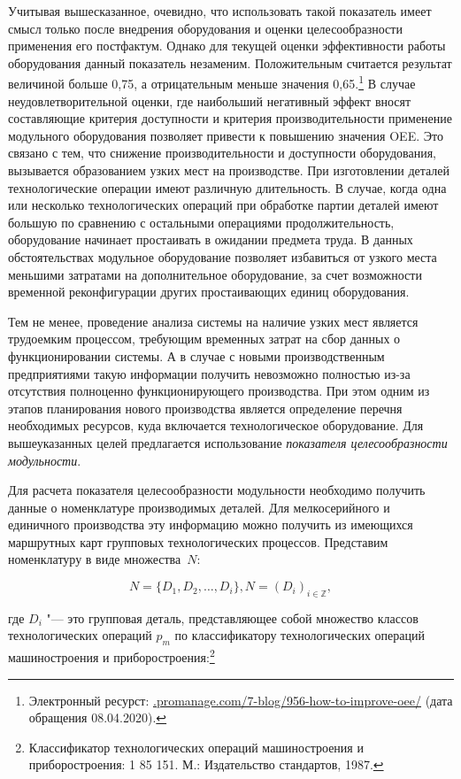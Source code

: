 Учитывая вышесказанное, очевидно, что использовать такой показатель имеет смысл только после внедрения оборудования и оценки целесообразности применения его постфактум. Однако для текущей оценки эффективности работы оборудования данный показатель незаменим. Положительным считается результат величиной больше 0,75, а отрицательным меньше значения 0,65.\footnote{Электронный ресурст: \url{.promanage.com/7-blog/956-how-to-improve-oee/} (дата обращения 08.04.2020).} В случае неудовлетворительной оценки, где наибольший негативный эффект вносят составляющие критерия доступности и критерия производительности применение модульного оборудования позволяет привести к повышению значения OEE. Это связано с тем, что снижение производительности и доступности оборудования, вызывается образованием узких мест на производстве. При изготовлении деталей технологические операции имеют различную длительность. В случае, когда одна или несколько технологических операций при обработке партии деталей имеют большую по сравнению с остальными операциями продолжительность, оборудование начинает простаивать в ожидании предмета труда. В данных обстоятельствах модульное оборудование позволяет избавиться от узкого места меньшими затратами на дополнительное оборудование, за счет возможности временной реконфигурации других простаивающих единиц оборудования. 

Тем не менее, проведение анализа системы на наличие узких мест является трудоемким процессом, требующим временных затрат на сбор данных о функционировании системы. А в случае с новыми производственным предприятиями такую информации получить невозможно полностью из-за отсутствия полноценно функционирующего производства. При этом одним из этапов планирования нового производства является определение перечня необходимых ресурсов, куда включается технологическое оборудование. Для вышеуказанных целей предлагается использование \textit{показателя целесообразности модульности}. 

Для расчета показателя целесообразности модульности необходимо получить данные о номенклатуре производимых деталей. Для мелкосерийного и единичного производства эту информацию можно получить из имеющихся маршрутных карт групповых технологических процессов. Представим номенклатуру в виде множества~$N$:

\[
N = \{D_1, D_2, \ldots, D_i\}, N = (D_i)_{i \in \mathbb{Z}},
\]


где $D_i$ "--- это групповая деталь, представляющее собой множество классов технологических операций $p_m$ по классификатору технологических операций машиностроения и приборостроения:\footnote{Классификатор технологических операций машиностроения и приборостроения: 1 85 151. М.: Издательство стандартов, 1987.}


